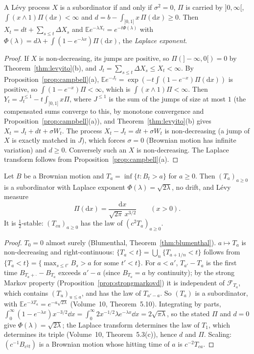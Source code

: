 \begin{corollary}\label{cor:subordinator}
A L\'evy process $X$ is a subordinator if and only if $\sigma^2=0$, $\Pi$ is carried by $]0,\infty[$, $\int(x\wedge1)\Pi(\mathrm dx)<\infty$ and $d=b-\int_{]0,1]}x\,\Pi(\mathrm dx)\ge0$. Then
$X_t=dt+\sum_{s\le t}\Delta X_s$ and $\mathbb Ee^{-\lambda X_t}=e^{-t\Phi(\lambda)}$ with $\Phi(\lambda)=d\lambda+\int(1-e^{-\lambda x})\Pi(\mathrm dx)$, the \emph{Laplace exponent}.
\end{corollary}

\begin{proof}
If $X$ is non-decreasing, its jumps are positive, so $\Pi(]-\infty,0[)=0$ by Theorem~\ref{thm:levyito}(b), and $J_t=\sum_{s\le t}\Delta X_s\le X_t<\infty$. By Proposition~\ref{prop:campbell}(a),
$\mathbb Ee^{-J_t}=\exp(-t\int(1-e^{-x})\Pi(\mathrm dx))$ is positive, so $\int(1-e^{-x})\Pi<\infty$, which is $\int(x\wedge1)\Pi<\infty$. Then $Y_t=J^{\le1}_t-t\int_{]0,1]}x\Pi$, where $J^{\le1}$ is the sum of the jumps of size at most $1$
(the compensated sums converge to this, by monotone convergence and Proposition~\ref{prop:campbell}(a)), and Theorem~\ref{thm:levyito}(b) gives $X_t=J_t+dt+\sigma W_t$. The process $X_t-J_t=dt+\sigma W_t$ is non-decreasing (a jump of
$X$ is exactly matched in $J$), which forces $\sigma=0$ (Brownian motion has infinite variation) and $d\ge0$. Conversely such an $X$ is non-decreasing. The Laplace transform follows from Proposition~\ref{prop:campbell}(a).
\end{proof}

\begin{theorem}\label{thm:halfstable}
Let $B$ be a Brownian motion and $T_a=\inf\{t:B_t>a\}$ for $a\ge0$. Then $(T_a)_{a\ge0}$ is a subordinator with Laplace exponent $\Phi(\lambda)=\sqrt{2\lambda}$, no drift, and L\'evy measure
\[
\Pi(\mathrm dx)=\frac{\mathrm dx}{\sqrt{2\pi}\,x^{3/2}}\qquad(x>0).
\]
It is $\frac12$-stable: $(T_{ca})_{a\ge0}$ has the law of $(c^2T_a)_{a\ge0}$.
\end{theorem}

\begin{proof}
$T_0=0$ almost surely (Blumenthal, Theorem~\ref{thm:blumenthal}). $a\mapsto T_a$ is non-decreasing and right-continuous: $\{T_a<t\}=\bigcup_n\{T_{a+1/n}<t\}$ follows from $\{T_a<t\}=\{\max_{s\le t'}B_s>a\text{ for some }t'<t\}$.
For $a<a'$, $T_{a'}-T_a$ is the first time $B_{T_a+\cdot}-B_{T_a}$ exceeds $a'-a$ (since $B_{T_a}=a$ by continuity); by the strong Markov property (Proposition~\ref{prop:strongmarkovd}) it is independent of $\mathcal F_{T_a}$, which contains
$(T_u)_{u\le a}$, and has the law of $T_{a'-a}$. So $(T_a)$ is a subordinator, with $\mathbb Ee^{-\lambda T_a}=e^{-a\sqrt{2\lambda}}$ (Volume~10, Theorem~5.10). Integrating by parts,
$\int_0^\infty(1-e^{-\lambda x})x^{-3/2}\dd x=\int_0^\infty2x^{-1/2}\lambda e^{-\lambda x}\dd x=2\sqrt{\pi\lambda}$, so the stated $\Pi$ and $d=0$ give $\Phi(\lambda)=\sqrt{2\lambda}$; the Laplace transform determines the law of $T_1$, which determines its triple (Volume~10, Theorem~5.3(c)), hence $d$ and $\Pi$. Scaling: $(c^{-1}B_{c^2t})$ is a Brownian motion whose hitting time of $a$ is $c^{-2}T_{ca}$.
\end{proof}

